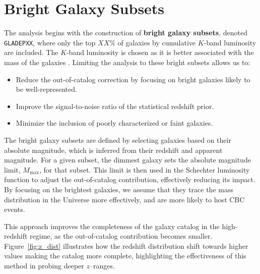 \section{Bright Galaxy Subsets}
The analysis begins with the construction of \textbf{bright galaxy subsets}, denoted \texttt{GLADEPXX}, where only the top $XX\%$ of galaxies by cumulative $K$-band luminosity are included. The $K$-band luminosity is chosen as it is better associated with the mass of the galaxies \citep{strazzullo2006near,sureshkumar2021galaxy}. Limiting the analysis to these bright subsets allows us to:
\vspace{-1em}
\begin{itemize}
  \item Reduce the out-of-catalog correction by focusing on bright galaxies likely to be well-represented.
  \vspace{-1em}
  \item Improve the signal-to-noise ratio of the statistical redshift prior.
  \vspace{-1em}
  \item Minimize the inclusion of poorly characterized or faint galaxies.
\end{itemize}

The bright galaxy subsets are defined by selecting galaxies based on their absolute magnitude, which is inferred from their redshift and apparent magnitude. For a given subset, the dimmest galaxy sets the absolute magnitude limit, $M_{\mathrm{max}}$, for that subset. This limit is then used in the Schechter luminosity function to adjust the out-of-catalog contribution, effectively reducing its impact. By focusing on the brightest galaxies, we assume that they trace the mass distribution in the Universe more effectively, and are more likely to host \ac{CBC} events.

This approach improves the completeness of the galaxy catalog in the high-redshift regime, as the out-of-catalog contribution becomes smaller. Figure~\ref{fig:z_dist} illustrates how the redshift distribution shift towards higher values making the catalog more complete, highlighting the effectiveness of this method in probing deeper $z$--ranges.

